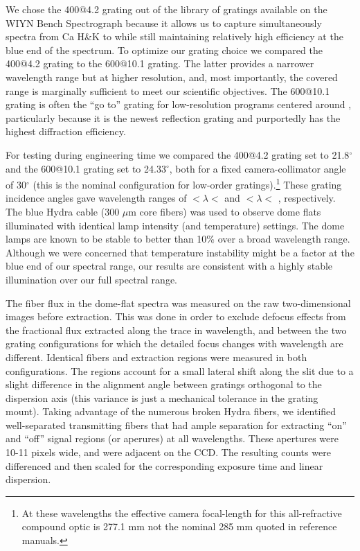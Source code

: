 We chose the 400@4.2 grating out of the library of gratings available
on the WIYN Bench Spectrograph because it allows us to capture
simultaneously spectra from Ca H\&K to \Ha while still maintaining
relatively high efficiency at the blue end of the spectrum.  To
optimize our grating choice we compared the 400@4.2 grating to the
600@10.1 grating. The latter provides a narrower wavelength range but
at higher resolution, and, most importantly, the covered range is
marginally sufficient to meet our scientific objectives.  The 600@10.1
grating is often the ``go to'' grating for low-resolution programs
centered around , particularly because it is the newest
reflection grating and purportedly has the highest diffraction
efficiency.

For testing during engineering time we compared the 400@4.2 grating
set to 21.8$^{\circ}$ and the 600@10.1 grating set to 24.33$^{\circ}$,
both for a fixed camera-collimator angle of 30$^{\circ}$ (this is the
nominal configuration for low-order gratings).\footnote{At these
  wavelengths the effective camera focal-length for this
  all-refractive compound optic is 277.1 mm not the nominal 285 mm
  quoted in reference manuals.} These grating incidence angles gave
wavelength ranges of $< \lambda <$  and
$< \lambda <$ , respectively. The blue
Hydra cable (300 $\mu$m core fibers) was used to observe dome flats
illuminated with identical lamp intensity (and temperature)
settings. The dome lamps are known to be stable to better than 10\%
over a broad wavelength range. Although we were concerned that
temperature instability might be a factor at the blue end of our
spectral range, our results are consistent with a highly stable
illumination over our full spectral range.

The fiber flux in the dome-flat spectra was measured on the raw
two-dimensional images before extraction. This was done in order to
exclude defocus effects from the fractional flux extracted along the
trace in wavelength, and between the two grating configurations for
which the detailed focus changes with wavelength are different.
Identical fibers and extraction regions were measured in both
configurations. The regions account for a small lateral shift along
the slit due to a slight difference in the alignment angle between
gratings orthogonal to the dispersion axis (this variance is just a
mechanical tolerance in the grating mount). Taking advantage of the
numerous broken Hydra fibers, we identified well-separated
transmitting fibers that had ample separation for extracting ``on''
and ``off'' signal regions (or aperures) at all wavelengths.  These
apertures were 10-11 pixels wide, and were adjacent on the CCD.  The
resulting counts were differenced and then scaled for the
corresponding exposure time and linear dispersion. 

